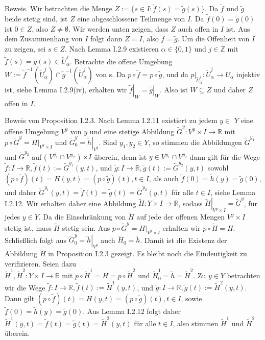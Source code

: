 \documentclass[10pt, letterpaper]{article}
\begin{document}
Beweis. Wir betrachten die Menge $Z:=\{s \in I: \tilde{f}(s)=\tilde{g}(s)\}$. Da $\tilde{f}$ und $\tilde{g}$ beide stetig sind, ist $Z$ eine abgeschlossene Teilmenge von $I$. Da $\tilde{f}(0)=\tilde{g}(0)$ ist $0 \in Z$, also $Z \neq \emptyset$. Wir werden unten zeigen, dass $Z$ auch offen in $I$ ist. Aus dem Zusammenhang von $I$ folgt dann $Z=I$, also $\tilde{f}=\tilde{g}$. Um die Offenheit von $I$ zu zeigen, sei $s \in Z$. Nach Lemma I.2.9 existieren $\alpha \in\{0,1\}$ und $j \in \mathbb{Z}$ mit $\tilde{f}(s)=\tilde{g}(s) \in \tilde{U}_{\alpha}^{j}$. Betrachte die offene Umgebung $W:=\tilde{f}^{-1}\left(\tilde{U}_{\alpha}^{j}\right) \cap \tilde{g}^{-1}\left(\tilde{U}_{\alpha}^{j}\right)$ von s. Da $p \circ \tilde{f}=p \circ \tilde{g}$, und da $\left.p\right|_{\tilde{U}_{\alpha}^{j}}: \tilde{U}_{\alpha}^{j} \rightarrow U_{\alpha}$ injektiv ist, siehe Lemma I.2.9(iv), erhalten wir $\left.\tilde{f}\right|_{W}=\left.\tilde{g}\right|_{W}$. Also ist $W \subseteq Z$ und daher $Z$ offen in $I$.

Beweis von Proposition I.2.3. Nach Lemma I.2.11 existiert zu jedem $y \in$ $Y$ eine offene Umgebung $V^{y}$ von $y$ und eine stetige Abbildung $\tilde{G}^{y}: V^{y} \times I \rightarrow \mathbb{R}$ mit $p \circ \tilde{G}^{y}=\left.H\right|_{V^{y} \times I}$ und $\tilde{G}_{0}^{y}=\left.\tilde{h}\right|_{V^{y}}$. Sind $y_{1}, y_{2} \in Y$, so stimmen die Abbildungen $\tilde{G}^{y_{1}}$ und $\tilde{G}^{y_{2}}$ auf ( $V^{y_{1}} \cap V^{y_{2}}$ ) $\times I$ überein, denn ist $y \in V^{y_{1}} \cap V^{y_{2}}$ dann gilt für die Wege $\tilde{f}: I \rightarrow \mathbb{R}, \tilde{f}(t):=\tilde{G}^{y_{1}}(y, t)$, und $\tilde{g}: I \rightarrow \mathbb{R}, \tilde{g}(t):=\tilde{G}^{y_{2}}(y, t)$ sowohl $(p \circ \tilde{f})(t)=H(y, t)=(p \circ \tilde{g})(t), t \in I$, als auch $\tilde{f}(0)=\tilde{h}(y)=\tilde{g}(0)$, und daher $\tilde{G}^{y_{1}}(y, t)=\tilde{f}(t)=\tilde{g}(t)=\tilde{G}^{y_{2}}(y, t)$ für alle $t \in I$, siehe Lemma I.2.12. Wir erhalten daher eine Abbildung $\tilde{H}: Y \times I \rightarrow \mathbb{R}$, sodass $\left.\tilde{H}\right|_{V^{y} \times I}=\tilde{G}^{y}$, für jedes $y \in Y$. Da die Einschränkung von $\tilde{H}$ auf jede der offenen Mengen $V^{y} \times I$ stetig ist, muss $\tilde{H}$ stetig sein. Aus $p \circ \tilde{G}^{y}=\left.H\right|_{V^{y} \times I}$ erhalten wir $p \circ \tilde{H}=H$. Schließlich folgt aus $\tilde{G}_{0}^{y}=\left.\tilde{h}\right|_{V^{y}}$ auch $\tilde{H}_{0}=\tilde{h}$. Damit ist die Existenz der Abbildung $\tilde{H}$ in Proposition I.2.3 gezeigt. Es bleibt noch die Eindeutigkeit zu verifizieren. Seien dazu\\
$\tilde{H}^{1}, \tilde{H}^{2}: Y \times I \rightarrow \mathbb{R}$ mit $p \circ \tilde{H}^{1}=H=p \circ \tilde{H}^{2}$ und $\tilde{H}_{0}^{1}=\tilde{h}=\tilde{H}^{2}$. Zu $y \in Y$ betrachten wir die Wege $\tilde{f}: I \rightarrow \mathbb{R}, \tilde{f}(t):=\tilde{H}^{1}(y, t)$, und $\tilde{g}: I \rightarrow \mathbb{R}, \tilde{g}(t):=\tilde{H}^{2}(y, t)$. Dann gilt $(p \circ \tilde{f})(t)=H(y, t)=(p \circ \tilde{g})(t), t \in I$, sowie $\tilde{f}(0)=\tilde{h}(y)=\tilde{g}(0)$. Aus Lemma I.2.12 folgt daher $\tilde{H}^{1}(y, t)=\tilde{f}(t)=\tilde{g}(t)=\tilde{H}^{2}(y, t)$ für alle $t \in I$, also stimmen $\tilde{H}^{1}$ und $\tilde{H}^{2}$ überein.
\end{document}

